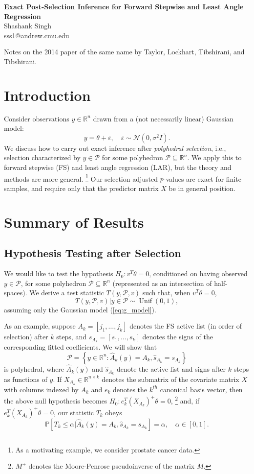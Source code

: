 \documentclass{article}
\newcommand{\R}{\mathbb{R}}                         %
\newcommand{\e}{\varepsilon}                        %
\newcommand{\pr}{\mathbb{P}}                        %
\renewcommand{\hat}{\widehat}
\newcommand{\poly}{\mathcal{P}}
\newcommand{\Unif}{\operatorname{Unif}}             %
\begin{document}
\begin{center}
{\bf\Large Exact Post-Selection Inference for Forward Stepwise and Least Angle
Regression}\\
Shashank Singh\\
sss1@andrew.cmu.edu\\
\end{center}

Notes on the 2014 paper of the same name by Taylor, Lockhart, Tibshirani, and
Tibshirani.

\section{Introduction}
Consider observations $y \in \R^n$ drawn from a (not necessarily linear)
Gaussian model:
\begin{equation}
y = \theta + \e, \quad \e \sim \mathcal{N}(0,\sigma^2 I).
\label{eq:g_model}
\end{equation}
We discuss how to carry out exact inference after \emph{polyhedral selection},
i.e., selection characterized by $y \in \poly$ for some polyhedron
$\poly \subseteq \R^n$. We apply this to forward stepwise (FS) and least angle
regression (LAR), but the theory and methods are more general.
\footnote{As a motivating example, we consider prostate cancer data.}
Our selection adjusted $p$-values are exact for finite samples, and require
only that the predictor matrix $X$ be in general position.

\section{Summary of Results}
\subsection{Hypothesis Testing after Selection}
We would like to test the hypothesis $H_0 : v^T \theta = 0$, conditioned on
having observed $y \in \poly$, for some polyhedron $\poly \subseteq \R^n$
(represented as an intersection of half-spaces). We derive a test statistic
$T(y,\poly,v)$ such that, when $v^T \theta = 0$,
\[T(y,\poly,v) | y \in \poly \sim \Unif(0,1),\]
assuming only the Gaussian model (\ref{eq:g_model}).

As an example, suppose $A_k = [j_1,\dots,j_k]$ denotes the FS active list (in
order of selection) after $k$ steps, and $s_{A_k} = [s_1,\dots,s_k]$ denotes
the signs of the corresponding fitted coefficients. We will show that
\[\poly
    = \left\{ y \in \R^n : \hat A_k(y) = A_k,
                                            \hat s_{A_k} = s_{A_k} \right\}\]
is polyhedral, where $\hat A_k(y)$ and $\hat s_{A_k}$ denote the active list
and signs after $k$ steps as functions of $y$. If $X_{A_k} \in \R^{n \times k}$
denotes the submatrix of the covariate matrix $X$ with columns indexed by $A_k$
and $e_k$ denotes the $k^{th}$ canonical basis vector, then the above null
hypothesis becomes $H_0 : e_k^T (X_{A_k})^+ \theta = 0$,
\footnote{$M^+$ denotes the Moore-Penrose pseudoinverse of the matrix $M$.}
and, if $e_k^T (X_{A_k})^+ \theta = 0$, our statistic $T_k$ obeys
\[\pr\left[ T_k \leq \alpha | \hat A_k(y) = A_k, \hat s_{A_k} = s_{A_k} \right]
    = \alpha, \quad \alpha \in [0,1].\]
\end{document}
